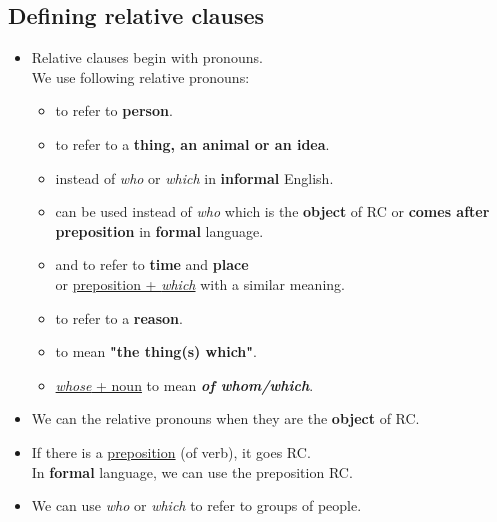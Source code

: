 \subsection{Defining relative clauses}
\begin{itemize}
    \item Relative clauses begin with pronouns.\\
    We use following relative pronouns:
    \begin{itemize}
        \item {} to refer to \textbf{person}.
        \item {} to refer to a \textbf{thing, an animal or an idea}.
        \item {} instead of \textit{who} or \textit{which} in \textbf{informal} English.
        \item[\daash]  can be used instead of \textit{who}
        which is the \textbf{object} of RC or \textbf{comes after preposition} in \textbf{formal} language.
        \item[\daash]  and  to refer to \textbf{time} and \textbf{place}\\
        or \underline{preposition + \textit{which}} with a similar meaning.
        \item[\daash]  to refer to a \textbf{reason}.
        \item[\daash]  to mean \textbf{"the thing(s) which"}.
        \item[\daash] \underline{\textit{whose} + noun} to mean \textbf{\textit{of whom/which}}.
    \end{itemize}
    \item We can  the relative pronouns when they are the \textbf{object} of RC.
    \item[\doot] If there is a \underline{preposition} (of verb), it goes  RC.\\
    In \textbf{formal} language, we can use the preposition  RC.
    \item[\aast] We can use \textit{who} or \textit{which} to refer to groups of people.
\end{itemize}

